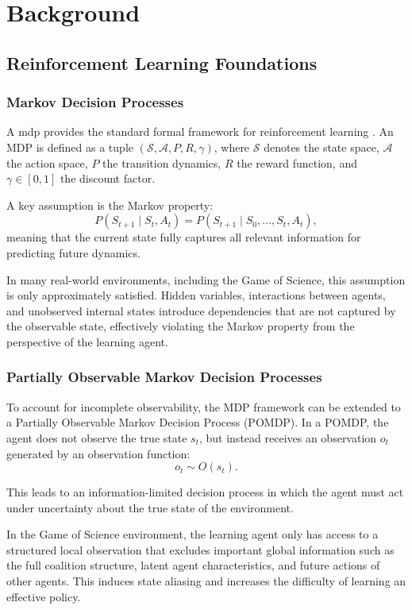 \documentclass[english,bachelor]{hsluthesis}
\begin{document}
\chapter{Background}

\section{Reinforcement Learning Foundations}
\subsection{Markov Decision Processes}
A \gls{mdp} provides the standard formal framework for reinforcement learning \cite{sutton2018reinforcement}. An MDP is defined as a tuple $(\mathcal{S}, \mathcal{A}, P, R, \gamma)$, where $\mathcal{S}$ denotes the state space, $\mathcal{A}$ the action space, $P$ the transition dynamics, $R$ the reward function, and $\gamma \in [0,1]$ the discount factor.

A key assumption is the Markov property:
\[
P(S_{t+1} \mid S_t, A_t) = P(S_{t+1} \mid S_0, \dots, S_t, A_t),
\]
meaning that the current state fully captures all relevant information for predicting future dynamics.

In many real-world environments, including the Game of Science, this assumption is only approximately satisfied. Hidden variables, interactions between agents, and unobserved internal states introduce dependencies that are not captured by the observable state, effectively violating the Markov property from the perspective of the learning agent.

\subsection{Partially Observable Markov Decision Processes}
To account for incomplete observability, the MDP framework can be extended to a Partially Observable Markov Decision Process (POMDP). In a POMDP, the agent does not observe the true state $s_t$, but instead receives an observation $o_t$ generated by an observation function:
\[
o_t \sim O(s_t).
\]

This leads to an information-limited decision process in which the agent must act under uncertainty about the true state of the environment.

In the Game of Science environment, the learning agent only has access to a structured local observation that excludes important global information such as the full coalition structure, latent agent characteristics, and future actions of other agents. This induces state aliasing and increases the difficulty of learning an effective policy.
\end{document}
